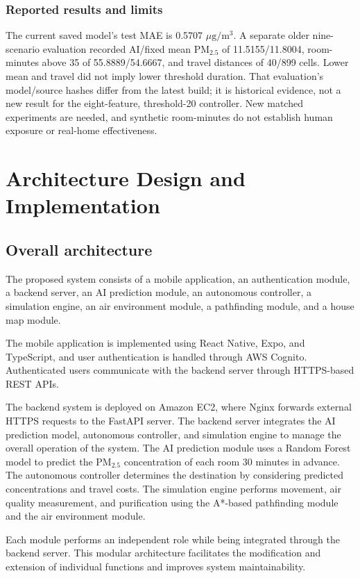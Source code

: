\documentclass[conference]{IEEEtran}
\newcommand{\pmfine}{\ensuremath{\mathrm{PM}_{2.5}}}
\newcommand{\pmunit}{\ensuremath{\mu\mathrm{g}/\mathrm{m}^3}}
\begin{document}
\subsubsection{Reported results and limits}

The current saved model's test MAE is 0.5707 \pmunit{}. A separate older nine-scenario evaluation recorded AI/fixed mean \pmfine{} of 11.5155/11.8004, room-minutes above 35 of 55.8889/54.6667, and travel distances of 40/899 cells. Lower mean and travel did not imply lower threshold duration. That evaluation's model/source hashes differ from the latest build; it is historical evidence, not a new result for the eight-feature, threshold-20 controller. New matched experiments are needed, and synthetic room-minutes do not establish human exposure or real-home effectiveness.

\section{Architecture Design and Implementation}

\subsection{Overall architecture}

The proposed system consists of a mobile application, an authentication module, a backend server, an AI prediction module, an autonomous controller, a simulation engine, an air environment module, a pathfinding module, and a house map module.

The mobile application is implemented using React Native, Expo, and TypeScript, and user authentication is handled through AWS Cognito. Authenticated users communicate with the backend server through HTTPS-based REST APIs.

The backend system is deployed on Amazon EC2, where Nginx forwards external HTTPS requests to the FastAPI server. The backend server integrates the AI prediction model, autonomous controller, and simulation engine to manage the overall operation of the system. The AI prediction module uses a Random Forest model to predict the \pmfine{} concentration of each room 30 minutes in advance. The autonomous controller determines the destination by considering predicted concentrations and travel costs. The simulation engine performs movement, air quality measurement, and purification using the A*-based pathfinding module and the air environment module.

Each module performs an independent role while being integrated through the backend server. This modular architecture facilitates the modification and extension of individual functions and improves system maintainability.
\end{document}
